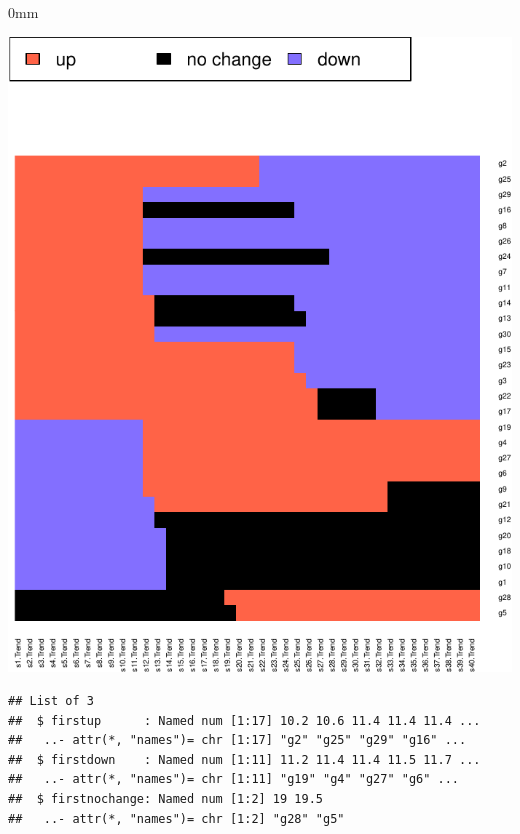 \documentclass{article}
\begin{document}
\begin{knitrout}
\color{fgcolor}\begin{kframe}
\begin{alltt}
 \hlkwb{<-} \hlstd{(}    \hlstd{=}\hlstd{)}
 \hlkwb{<-} 
 \hlkwb{<-} 
 \hlkwb{<-} 
\end{alltt}
\end{kframe}\begin{adjustwidth}{\fltoffset}{0mm}

{\centering \includegraphics[width=.8\textwidth]{figure/unnamed-chunk-17-1} 

}

\end{adjustwidth}\begin{kframe}\begin{alltt}
\end{alltt}
\begin{verbatim}
## List of 3
##  $ firstup      : Named num [1:17] 10.2 10.6 11.4 11.4 11.4 ...
##   ..- attr(*, "names")= chr [1:17] "g2" "g25" "g29" "g16" ...
##  $ firstdown    : Named num [1:11] 11.2 11.4 11.4 11.5 11.7 ...
##   ..- attr(*, "names")= chr [1:11] "g19" "g4" "g27" "g6" ...
##  $ firstnochange: Named num [1:2] 19 19.5
##   ..- attr(*, "names")= chr [1:2] "g28" "g5"
\end{verbatim}
\end{kframe}
\end{knitrout}
\end{document}

